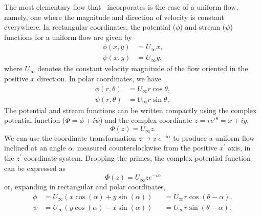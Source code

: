 \documentclass[10pt, twoside]{book}
\begin{document}
			The most elementary flow that \MATfluids\ incorporates is the case of a uniform flow, namely, one where the magnitude and direction of velocity is constant everywhere. In rectangular coordinates, the potential ($\phi$) and stream ($\psi$) functions for a uniform flow are given by
			\begin{subequations}
				\label{eq:UniformFlowDef}
				\begin{align}
					\phi\left(x,y\right) &= U_{\infty}x,\label{eq:UniformFlowDefPhi}\\
					\psi\left(x,y\right) &= U_{\infty}y,\label{eq:UniformFlowDefPsi}
				\end{align}
			\end{subequations}
			where $U_{\infty}$ denotes the constant velocity magnitude of the flow oriented in the positive $x$ direction. In polar coordinates, we have
			\begin{subequations}
				\label{eq:UniformFlowPDef}
				\begin{align}
					\phi\left(r,\theta\right) &= U_{\infty}r\cos\theta,\label{eq:UniformFlowPDefPhi}\\
					\psi\left(r,\theta\right) &= U_{\infty}r\sin\theta,\label{eq:UniformFlowPDefPsi}
				\end{align}
			\end{subequations}
			The potential and stream functions can be written compactly using the complex potential function ($\Phi = \phi + i\psi$) and the complex coordinate $z = re^{i\theta} = x + iy$,
			\begin{equation}
				\label{eq:UniformFlowDefPHI}
				\Phi\left(z\right) = U_{\infty}z.
			\end{equation}
			We can use the coordinate transformation $z \rightarrow z^{\prime}e^{-i\alpha}$ to produce a uniform flow inclined at an angle $\alpha$, measured counterclockwise from the positive $x^{\prime}$ axis, in the $z^{\prime}$ coordinate system. Dropping the primes, the complex potential function can be expressed as
			\begin{equation}
				\label{eq:UniformFlowDefPHI2}
				\Phi\left(z\right) = U_{\infty}ze^{-i\alpha}
			\end{equation}
			or, expanding in rectangular and polar coordinates,
			\begin{subequations}
				\label{eq:UniformFlowDef2}
				\begin{alignat}{2}
					\phi &= U_{\infty}\left(x\cos\left(\alpha\right) + y\sin\left(\alpha\right)\right) &&= U_{\infty}r\cos\left(\theta-\alpha\right),\label{eq:UniformFlowDefPhi2}\\
					\psi &= U_{\infty}\left(y\cos\left(\alpha\right) - x\sin\left(\alpha\right)\right) &&= U_{\infty}r\sin\left(\theta-\alpha\right).\label{eq:UniformFlowDefPsi2}
				\end{alignat}
			\end{subequations}
\end{document}
